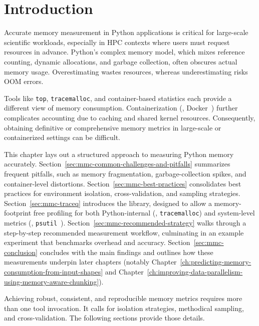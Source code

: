 \section{Introduction}
\label{sec:mmc-introduction}

Accurate memory measurement in Python applications is critical for large-scale scientific workloads, especially in \ac{HPC} contexts where users must request resources in advance.
Python's complex memory model, which mixes reference counting, dynamic allocations, and garbage collection, often obscures actual memory usage.
Overestimating wastes resources, whereas underestimating risks \ac{OOM} errors.

Tools like \texttt{top}\cite{top_linux_manpage}, \texttt{tracemalloc}\cite{tracemalloc}, and container-based statistics each provide a different view of memory consumption.
Containerization (\eg, Docker~\cite{docker}) further complicates accounting due to caching and shared kernel resources.
Consequently, obtaining definitive or comprehensive memory metrics in large-scale or containerized settings can be difficult.

This chapter lays out a structured approach to measuring Python memory accurately.
Section~\ref{sec:mmc-common-challenges-and-pitfalls} summarizes frequent pitfalls, such as memory fragmentation, garbage-collection spikes, and container-level distortions.
Section~\ref{sec:mmc-best-practices} consolidates best practices for environment isolation, cross-validation, and sampling strategies.
Section~\ref{sec:mmc-traceq} introduces the \traceq library, designed to allow a memory-footprint free profiling for both Python-internal (\eg, \texttt{tracemalloc}) and system-level metrics (\eg, \texttt{psutil}~\cite{psutil}).
Section~\ref{sec:mmc-recommended-strategy} walks through a step-by-step recommended measurement workflow, culminating in an example experiment that benchmarks overhead and accuracy.
Section~\ref{sec:mmc-conclusion} concludes with the main findings and outlines how these measurements underpin later chapters (notably Chapter~\ref{ch:predicting-memory-consumption-from-input-shapes} and Chapter~\ref{ch:improving-data-parallelism-using-memory-aware-chunking}).

Achieving robust, consistent, and reproducible memory metrics requires more than one tool invocation.
It calls for isolation strategies, methodical sampling, and cross-validation.
The following sections provide those details.